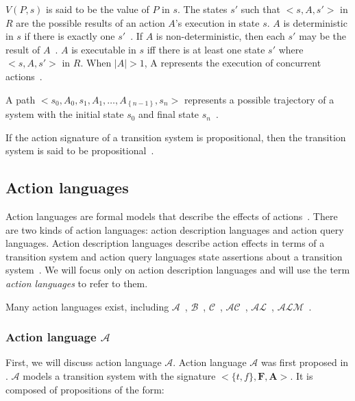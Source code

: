$ V(P,s) $ is said to be the value of $ P $ in $ s $.
The states $ s' $ such that $ <s, A, s'> $ in $ R $ are the possible results of an action $ A $'s execution in state $ s $.
$ A $ is deterministic in $ s $ if there is exactly one $ s' $~\cite{gelfond_action_1998}.
If $ A $ is non-deterministic, then each $ s' $ may be the result of $ A $~\cite{blount_architecture_2013}.
$ A $ is executable in $ s $ iff there is at least one state $ s' $ where $ <s, A, s'> $ in $ R $.
When $ \left|A\right|>1 $, A represents the execution of concurrent actions~\cite{gelfond_action_1998, blount_architecture_2013}.

A path $ <s_0, A_0, s_1, A_1, \dots, A_{\left\{n-1\right\}}, s_n> $ represents a possible trajectory of a system with the initial state $ s_0 $ and final state $ s_n $~\cite{blount_architecture_2013}.

If the action signature of a transition system is propositional, then the transition system is said to be propositional~\cite{gelfond_action_1998}.

\subsection{Action languages}
\label{subsec:action_languages}

Action languages are formal models that describe the effects of actions~\cite{gelfond_action_1998}.
There are two kinds of action languages: action description languages and action query languages.
Action description languages describe action effects in terms of a transition system and action query languages state assertions about a transition system~\cite{gelfond_action_1998}.
We will focus only on action description languages and will use the term \textit{action languages} to refer to them.

Many action languages exist, including $ \mathcal{A} $~\cite{gelfond_action_1998}, $ \mathcal{B} $~\cite{gelfond_action_1998}, $ \mathcal{C} $~\cite{gelfond_action_1998}, $ \mathcal{AC} $~\cite{turner_representing_1997}, $ \mathcal{AL} $~\cite{baral_reasoning_2000}, $ \mathcal{ALM} $~\cite{inclezan_modular_2016}.

\subsubsection{Action language $ \mathcal{A} $}
\label{subsubsec:action_language_a}

First, we will discuss action language $ \mathcal{A} $.
Action language $ \mathcal{A} $ was first proposed in \cite{pednault_formulating_1987}.
$ \mathcal{A} $ models a transition system with the signature $ <\{t, f\}, \boldsymbol{F}, \boldsymbol{A}> $.
It is composed of propositions of the form:


